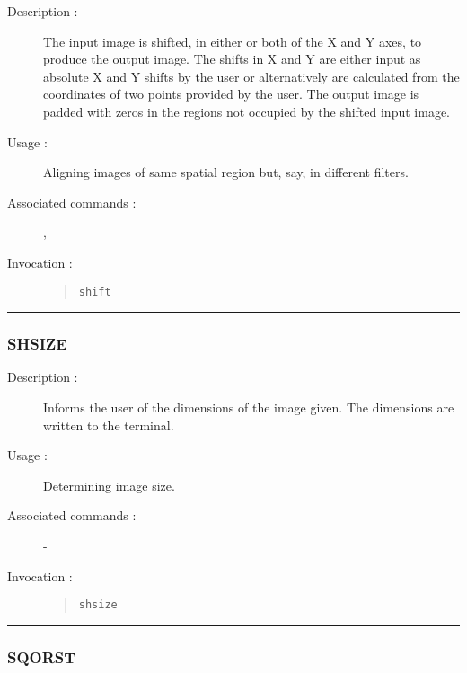 \begin{description}

\item[Description :] The input image is shifted, in either or both of
the X and Y axes, to produce the output image. The shifts in X and Y
are either input as absolute X and Y shifts by the user or
alternatively are calculated from the coordinates of two points
provided by the user. The output image is padded with zeros in the
regions not occupied by the shifted input image.

\item[Usage :] Aligning images of same spatial region but, say, in different
filters.
\item[Associated commands :] {\tt {}},
{\tt {}}
\item[Invocation :]

\begin{quote}{\tt  shift }\end{quote}

\end{description}

\hrule
\subsubsection*{\label{SHSIZE}SHSIZE}

\begin{description}

\item[Description :] Informs the user of the dimensions of the image
given.  The dimensions are written to the terminal.

\item[Usage :] Determining image size.
\item[Associated commands :] -
\item[Invocation :]

\begin{quote}{\tt  shsize }\end{quote}

\end{description}

\hrule
\subsubsection*{\label{SQORST}SQORST}

